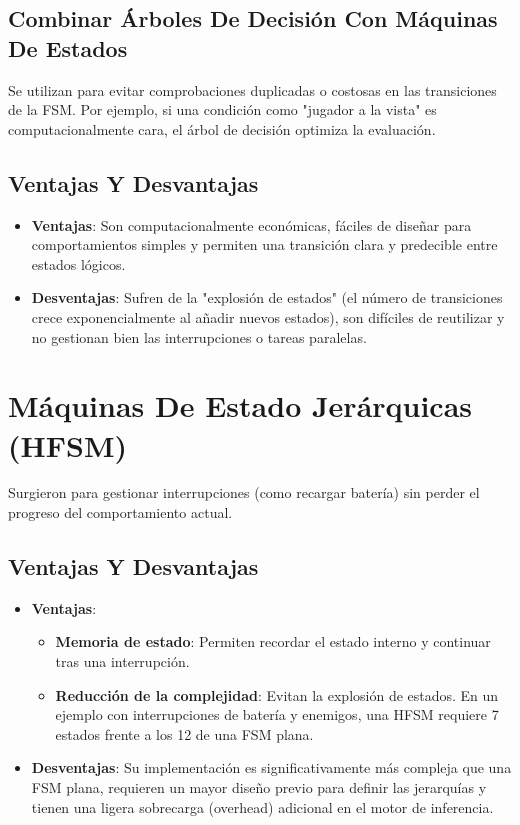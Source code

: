 \subsection{Combinar Árboles De Decisión Con Máquinas De Estados}
Se utilizan para evitar comprobaciones duplicadas o costosas en las transiciones de la FSM. Por ejemplo, si una condición como "jugador a la vista" es computacionalmente cara, el árbol de decisión optimiza la evaluación.

\subsection{Ventajas Y Desvantajas}
\begin{itemize}
    \item \textbf{Ventajas}: Son computacionalmente económicas, fáciles de diseñar para comportamientos simples y permiten una transición clara y predecible entre estados lógicos.
    \item \textbf{Desventajas}: Sufren de la "explosión de estados" (el número de transiciones crece exponencialmente al añadir nuevos estados), son difíciles de reutilizar y no gestionan bien las interrupciones o tareas paralelas.
\end{itemize}

\section{Máquinas De Estado Jerárquicas  (HFSM)}
Surgieron para gestionar interrupciones (como recargar batería) sin perder el progreso del comportamiento actual.

\subsection{Ventajas Y Desvantajas}
\begin{itemize}
    \item \textbf{Ventajas}:
        \begin{itemize}
            \item \textbf{Memoria de estado}: Permiten recordar el estado interno y continuar tras una interrupción.
            \item \textbf{Reducción de la complejidad}: Evitan la explosión de estados. En un ejemplo con interrupciones de batería y enemigos, una HFSM requiere 7 estados frente a los 12 de una FSM plana.
        \end{itemize}
    \item \textbf{Desventajas}: Su implementación es significativamente más compleja que una FSM plana, requieren un mayor diseño previo para definir las jerarquías y tienen una ligera sobrecarga (overhead) adicional en el motor de inferencia.
\end{itemize}

